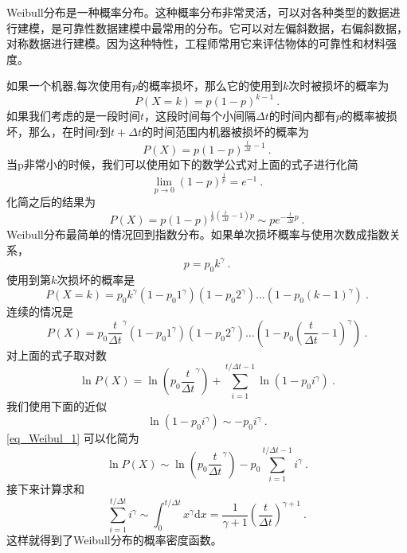 
Weibull分布是一种概率分布。这种概率分布非常灵活，可以对各种类型的数据进行建模，是可靠性数据建模中最常用的分布。它可以对左偏斜数据，右偏斜数据，对称数据进行建模。因为这种特性，工程师常用它来评估物体的可靠性和材料强度。

如果一个机器,每次使用有$p$的概率损坏，那么它的使用到$k$次时被损坏的概率为
\begin{equation}
P(X=k)=p(1-p)^{k-1}~.
\end{equation}
如果我们考虑的是一段时间$t$，这段时间每个小间隔$\Delta t$的时间内都有$p$的概率被损坏，那么，在时间$t$到$t+\Delta t$的时间范围内机器被损坏的概率为
\begin{equation}
P(X)=p(1-p)^{\frac{t}{\Delta t}-1}~.
\end{equation}
当p非常小的时候，我们可以使用如下的数学公式对上面的式子进行化简
\begin{equation}
\lim _{p \rightarrow 0}(1-p)^{\frac{1}{p}}=e^{-1}~.
\end{equation}
化简之后的结果为
\begin{equation}
P(X)=p(1-p)^{\frac{1}{p}\left(\frac{t}{\Delta t}-1\right) p} \sim p e^{-\frac{t}{\Delta t} p}~.
\end{equation}
Weibull分布最简单的情况回到指数分布。如果单次损坏概率与使用次数成指数关系，
\begin{equation}
p=p_0 k^\gamma~.
\end{equation}
使用到第$k$次损坏的概率是
\begin{equation}
P(X=k)=p_0 k^\gamma\left(1-p_0 1^\gamma\right)\left(1-p_0 2^\gamma\right) \ldots\left(1-p_0(k-1)^\gamma\right)~.
\end{equation}
连续的情况是
\begin{equation}
P(X)=p_0 \frac{t}{\Delta t}^\gamma\left(1-p_0 1^\gamma\right)\left(1-p_0 2^\gamma\right) \ldots\left(1-p_0\left(\frac{t}{\Delta t}-1\right)^\gamma\right)~.
\end{equation}
对上面的式子取对数
\begin{equation}\label{eq_Weibul_1}
\ln P(X)=\ln \left(p_0 \frac{t}{\Delta t}^\gamma\right)+\sum_{i=1}^{t / \Delta t-1} \ln \left(1-p_0 i^\gamma\right)~.
\end{equation}
我们使用下面的近似
\begin{equation}
\ln \left(1-p_0 i^\gamma\right) \sim-p_0 i^\gamma~.
\end{equation}
\autoref{eq_Weibul_1} 可以化简为
\begin{equation}
\ln P(X) \sim \ln \left(p_0 \frac{t}{\Delta t}^\gamma\right)-p_0 \sum_{i=1}^{t / \Delta t-1} i^\gamma~.
\end{equation}
接下来计算求和
\begin{equation}
\sum_{i=1}^{t / \Delta t} i^\gamma \sim \int_0^{t / \Delta t} x^\gamma \mathrm{d} x=\frac{1}{\gamma+1}\left(\frac{t}{\Delta t}\right)^{\gamma+1}~.
\end{equation}
这样就得到了Weibull分布的概率密度函数。